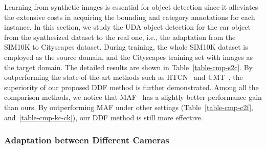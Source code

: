 \documentclass[journal]{IEEEtran}
\begin{document}
Learning from synthetic images is essential for object detection since it alleviates the extensive costs in acquiring the bounding and category annotations for each instance. In this section, we study the UDA object detection for the car object from the synthesized dataset to the real one, i.e., the adaptation from the SIM10K to Cityscapes dataset. During training, the whole SIM10K dataset is employed as the source domain, and the Cityscapes training set with  images as the target domain. The detailed results are shown in Table~\ref{table-cmp-s2c}. By outperforming the state-of-the-art methods such as HTCN~\cite{chen2020harmonizing} and UMT~\cite{deng2021unbiased}, the superiority of our proposed DDF method is further demonstrated. Among all the comparison methods, we notice that MAF~\cite{he2019multi} has a slightly better performance gain than ours. By outperforming MAF under other settings (Table~\ref{table-cmp-c2f}, and~\ref{table-cmp-kc-ck}), our DDF method is still more effective.



\subsubsection{Adaptation between Different Cameras}

\begin{table}[!htb]
\centering
\caption{Quantitative comparison with state-of-the-art methods on the UDA object detection tasks between the KITTI and Cityscapes datasets.  represents adaptation from the KITTI to the Cityscapes dataset, and vice versa.}
\label{table-cmp-kc-ck}
\end{table}
\end{document}
